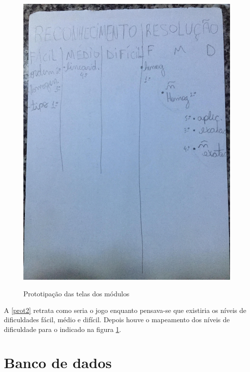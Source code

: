 \begin{figure}[H]
\centering
\caption{Prototipação das telas dos módulos}
\includegraphics[scale=0.4]{figuras/prot1.jpg}
\label{prot1}
\end{figure}

A \ref{prot2} retrata como seria o jogo enquanto pensava-se que existiria os níveis de dificuldades fácil, médio e difícil. Depois houve o mapeamento dos níveis de dificuldade para o indicado na figura \ref{prot1}.


\section[Banco de dados]{Banco de dados}

